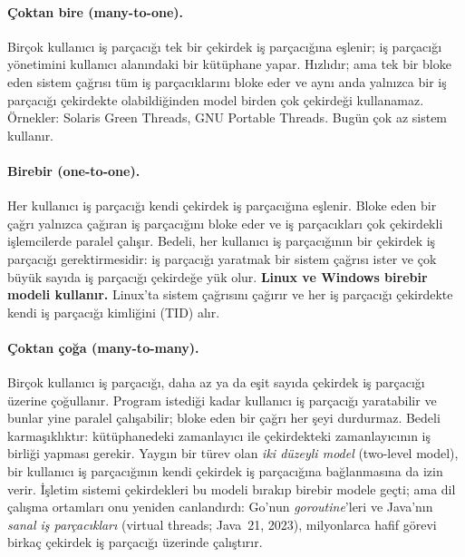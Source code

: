 \paragraph{Çoktan bire (many-to-one).} Birçok kullanıcı iş parçacığı tek bir çekirdek iş parçacığına eşlenir; iş parçacığı yönetimini kullanıcı alanındaki bir kütüphane yapar. Hızlıdır; ama tek bir bloke eden sistem çağrısı tüm iş parçacıklarını bloke eder ve aynı anda yalnızca bir iş parçacığı çekirdekte olabildiğinden model birden çok çekirdeği kullanamaz. Örnekler: Solaris Green Threads, GNU Portable Threads. Bugün çok az sistem kullanır.

\paragraph{Birebir (one-to-one).} Her kullanıcı iş parçacığı kendi çekirdek iş parçacığına eşlenir. Bloke eden bir çağrı yalnızca çağıran iş parçacığını bloke eder ve iş parçacıkları çok çekirdekli işlemcilerde paralel çalışır. Bedeli, her kullanıcı iş parçacığının bir çekirdek iş parçacığı gerektirmesidir: iş parçacığı yaratmak bir sistem çağrısı ister ve çok büyük sayıda iş parçacığı çekirdeğe yük olur. \textbf{Linux ve Windows birebir modeli kullanır.} Linux'ta   sistem çağrısını çağırır ve her iş parçacığı çekirdekte kendi iş parçacığı kimliğini (TID) alır.

\paragraph{Çoktan çoğa (many-to-many).} Birçok kullanıcı iş parçacığı, daha az ya da eşit sayıda çekirdek iş parçacığı üzerine çoğullanır. Program istediği kadar kullanıcı iş parçacığı yaratabilir ve bunlar yine paralel çalışabilir; bloke eden bir çağrı her şeyi durdurmaz. Bedeli karmaşıklıktır: kütüphanedeki zamanlayıcı ile çekirdekteki zamanlayıcının iş birliği yapması gerekir. Yaygın bir türev olan \emph{iki düzeyli model} (two-level model), bir kullanıcı iş parçacığının kendi çekirdek iş parçacığına bağlanmasına da izin verir. İşletim sistemi çekirdekleri bu modeli bırakıp birebir modele geçti; ama dil çalışma ortamları onu yeniden canlandırdı: Go'nun \emph{goroutine}'leri ve Java'nın \emph{sanal iş parçacıkları} (virtual threads; Java~21, 2023), milyonlarca hafif görevi birkaç çekirdek iş parçacığı üzerinde çalıştırır.

